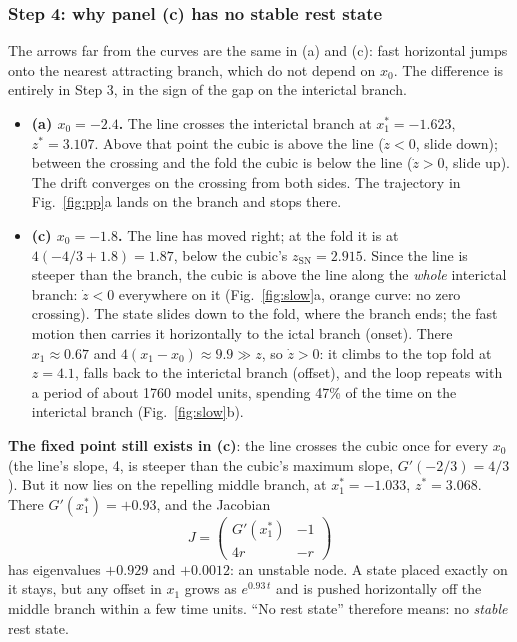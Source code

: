 \documentclass[11pt]{article}
\newcommand{\zsn}{z_{\mathrm{SN}}}
\begin{document}
\subsubsection*{Step 4: why panel (c) has no stable rest state}
The arrows far from the curves are the same in (a) and (c): fast horizontal jumps onto the nearest attracting branch, which
do not depend on $x_0$. The difference is entirely in Step 3, in the sign of the gap on the interictal branch.
\begin{itemize}
\item \textbf{(a) $x_0 = -2.4$.} The line crosses the interictal branch at $x_1^* = -1.623$, $z^* = 3.107$. Above that point
the cubic is above the line ($\dot z<0$, slide down); between the crossing and the fold the cubic is below the line
($\dot z>0$, slide up). The drift converges on the crossing from both sides. The trajectory in Fig.~\ref{fig:pp}a lands on
the branch and stops there.
\item \textbf{(c) $x_0 = -1.8$.} The line has moved right; at the fold it is at $4(-4/3 + 1.8) = 1.87$, below the cubic's
$\zsn = 2.915$. Since the line is steeper than the branch, the cubic is above the line along the \emph{whole} interictal
branch: $\dot z<0$ everywhere on it (Fig.~\ref{fig:slow}a, orange curve: no zero crossing). The state slides down to the
fold, where the branch ends; the fast motion then carries it horizontally to the ictal branch (onset). There $x_1\approx 0.67$
and $4(x_1-x_0)\approx 9.9\gg z$, so $\dot z>0$: it climbs to the top fold at $z=4.1$, falls back to the interictal branch
(offset), and the loop repeats with a period of about 1760 model units, spending 47\% of the time on the interictal
branch (Fig.~\ref{fig:slow}b).
\end{itemize}
\textbf{The fixed point still exists in (c)}: the line crosses the cubic once for every $x_0$ (the line's slope, 4, is
steeper than the cubic's maximum slope, $G'(-2/3) = 4/3$). But it now lies on the repelling middle branch, at
$x_1^* = -1.033$, $z^* = 3.068$. There $G'(x_1^*) = +0.93$, and the Jacobian
\[
J = \begin{pmatrix} G'(x_1^*) & -1\\ 4r & -r \end{pmatrix}
\]
has eigenvalues $+0.929$ and $+0.0012$: an unstable node. A state placed exactly on it stays, but any offset in $x_1$ grows
as $e^{0.93\,t}$ and is pushed horizontally off the middle branch within a few time units. ``No rest state'' therefore
means: no \emph{stable} rest state.
\end{document}
